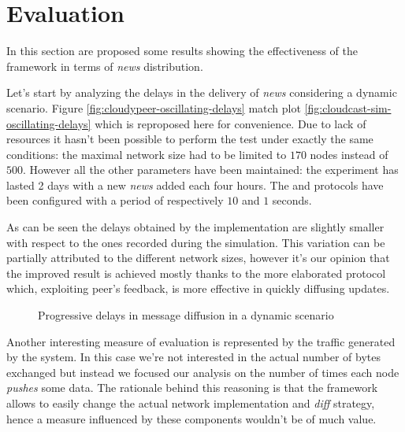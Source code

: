 \section{Evaluation}
In this section are proposed some results showing the
effectiveness of the framework in terms of \textit{news}
distribution.

Let's start by analyzing the delays in the delivery of \textit{news}
considering a dynamic scenario. Figure
\ref{fig:cloudypeer-oscillating-delays} match plot
\ref{fig:cloudcast-sim-oscillating-delays} which is reproposed here
for convenience. Due to lack of resources it hasn't been possible to
perform the test under exactly the same conditions: the maximal network
size had to be limited to $170$ nodes instead of $500$. However all
the other parameters have been maintained: the experiment has lasted 2
days with a new
\textit{news} added each four hours. The \antientropy and
\rumormongering protocols have been configured with a period of
respectively $10$ and $1$ seconds.

As can be seen the delays obtained by the \cloudypeer implementation
are slightly smaller with respect to the ones recorded during the
simulation.
This variation can be partially attributed to
the different network sizes, however it's our opinion that the
improved result is achieved mostly thanks to the more elaborated
\rumormongering protocol which, exploiting peer's feedback, is more
effective in quickly diffusing updates.

\begin{figure}[H]
  \centering
  \caption{Progressive delays in message diffusion in a dynamic scenario}
  \label{fig:cloudcast-globa-delay}
\end{figure}

Another interesting measure of evaluation is represented by the
traffic generated by the system. In this case we're not interested
in the actual number of bytes exchanged but instead we focused our
analysis on the number of times each node \textit{pushes} some
data. The rationale behind this reasoning is that the framework allows
to easily change the actual network implementation and \textit{diff}
strategy, hence a measure influenced by these components wouldn't be
of much value.

